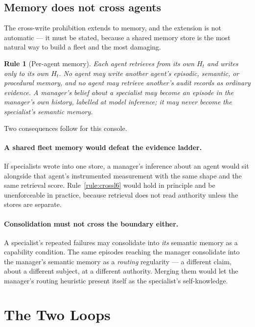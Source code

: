 \documentclass[11pt]{article}
\newtheorem{drule}{Rule}
\begin{document}
\subsection{Memory does not cross agents}

The cross-write prohibition extends to memory, and the extension is not automatic --- it must be stated, because a shared memory store is the most natural way to build a fleet and the most damaging.

\begin{drule}[Per-agent memory]
\label{rule:permemory}
Each agent retrieves from its own $H_t$ and writes only to its own $H_t$. No agent may write another agent's episodic, semantic, or procedural memory, and no agent may retrieve another's audit records as ordinary evidence. A manager's belief about a specialist may become an episode \emph{in the manager's own history}, labelled at model inference; it may never become the specialist's semantic memory.
\end{drule}

Two consequences follow for this console.

\paragraph{A shared fleet memory would defeat the evidence ladder.} If specialists wrote into one store, a manager's inference about an agent would sit alongside that agent's instrumented measurement with the same shape and the same retrieval score. Rule~\ref{rule:crossl6} would hold in principle and be unenforceable in practice, because retrieval does not read authority unless the stores are separate.

\paragraph{Consolidation must not cross the boundary either.} A specialist's repeated failures may consolidate into \emph{its} semantic memory as a capability condition. The same episodes reaching the manager consolidate into the manager's semantic memory as a \emph{routing} regularity --- a different claim, about a different subject, at a different authority. Merging them would let the manager's routing heuristic present itself as the specialist's self-knowledge.

\section{The Two Loops}
\label{sec:loops}
\end{document}
